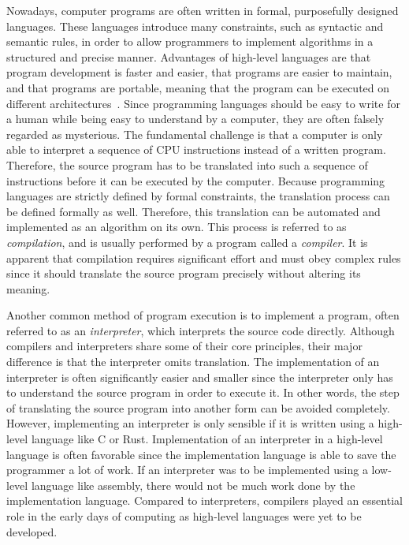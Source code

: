Nowadays, computer programs are often written in formal, purposefully designed languages.
These languages introduce many constraints, such as syntactic and semantic rules, in order to allow
programmers to implement algorithms in a structured and precise manner.
Advantages of high-level languages are that program development is faster and easier, that programs are easier to maintain, and that programs are portable,
meaning that the program can be executed on different architectures~\cite[p.~9]{Dandamudi2005Risc}.
Since programming languages should be easy to write for a human while being easy to understand by a computer,
they are often falsely regarded as mysterious.
The fundamental challenge is that a computer is only able to interpret a sequence of CPU instructions instead of a written program.
Therefore, the source program has to be translated into such a sequence of instructions before it can be executed by the computer.
Because programming languages are strictly defined by formal constraints, the translation process can be defined formally as well.
Therefore, this translation can be automated and implemented as an algorithm on its own.
This process is referred to as \emph{compilation}, and is usually performed by a program called a \emph{compiler}.
It is apparent that compilation requires significant effort and must obey complex rules
since it should translate the source program precisely without altering its meaning.

Another common method of program execution is to implement a program, often referred to as an \emph{interpreter}, which interprets the source code directly.
Although compilers and interpreters share some of their core principles, their major difference is that the interpreter omits translation.
The implementation of an interpreter is often significantly easier and smaller since the interpreter only has to understand the source program in order to execute it.
In other words, the step of translating the source program into another form can be avoided completely.
However, implementing an interpreter is only sensible if it is written using a high-level language like C or Rust.
Implementation of an interpreter in a high-level language is often favorable since the implementation language is able to save the programmer a lot of work.
If an interpreter was to be implemented using a low-level language like assembly, there would not be much work done by the implementation language.
Compared to interpreters, compilers played an essential role in the early days of computing as high-level languages were yet to be developed.

